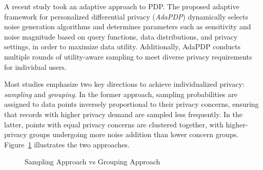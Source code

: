 A recent study \cite{Niu2021} took an adaptive approach to PDP. The proposed adaptive framework for personalized differential privacy ({\em AdaPDP}) dynamically selects noise generation algorithms and determines parameters such as sensitivity and noise magnitude based on query functions, data distributions, and privacy settings, in order to maximize data utility. Additionally, AdaPDP conducts multiple rounds of utility-aware sampling to meet diverse privacy requirements for individual users.

Most studies emphasize two key directions to achieve individualized privacy: {\em sampling} and {\em grouping}. In the former approach, sampling probabilities are assigned to data points inversely proportional to their privacy concerns, ensuring that records with higher privacy demand are sampled less frequently. In the latter, points with equal privacy concerns are clustered together, with higher-privacy groups undergoing more noise addition than lower concern groups. Figure~\ref{sampleGroup} illustrates the two approaches.

\begin{figure}[h]
\centering
   
   \caption{Sampling Approach vs Grouping Approach}\label{FigDiff}
   \label{sampleGroup}
\end{figure} 


